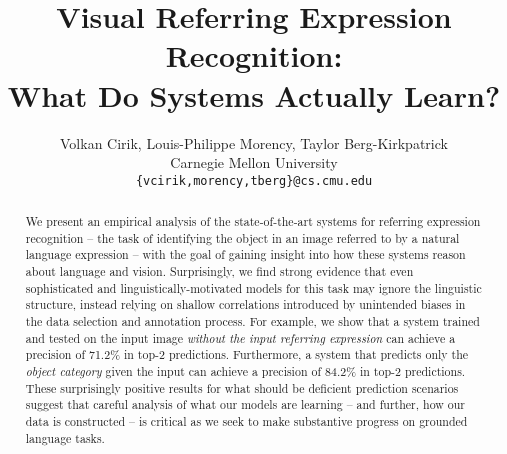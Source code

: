 \documentclass[11pt,a4paper]{article}
\title{Visual Referring Expression Recognition: \\ What Do Systems Actually Learn?}
\author{
  Volkan Cirik, Louis-Philippe Morency, Taylor Berg-Kirkpatrick  \\
Carnegie Mellon University\\
\texttt{\{vcirik,morency,tberg\}@cs.cmu.edu} \\
}
\begin{document}
\maketitle
\begin{abstract}
We present an empirical analysis of the state-of-the-art systems for referring expression recognition -- the task of identifying the object in an image referred to by a natural language expression -- with the goal of gaining insight into how these systems reason about language and vision. Surprisingly, we find strong evidence that even sophisticated and linguistically-motivated models for this task may ignore the linguistic structure, instead relying on shallow correlations introduced by unintended biases in the data selection and annotation process. For example, we show that a system trained and tested on the input image \emph{without the input referring expression} can achieve a precision of 71.2\% in top-2 predictions.
Furthermore, a system that predicts only the \emph{object category} given the input can achieve a precision of 84.2\% in top-2 predictions. These surprisingly positive results for what should be deficient prediction scenarios suggest that careful analysis of what our models are learning -- and further, how our data is constructed -- is critical as we seek to make substantive progress on grounded language tasks.
\end{abstract}
%
\newcommand \figurethree{
\begin{figure*}[h!]
\vspace{-5pt}
\centering
\texttt{[image: fig\_fig4.pdf]}
\caption{Overview of Neural Sieves. Sieve I filters object types having multiple instances. Sieve II filters objects of one category mentioned in referring expression.
Objects of the same category have the same color frames. Best seen in color.}\label{fig2}
\vspace{-5pt}
\end{figure*}
}
\end{document}

